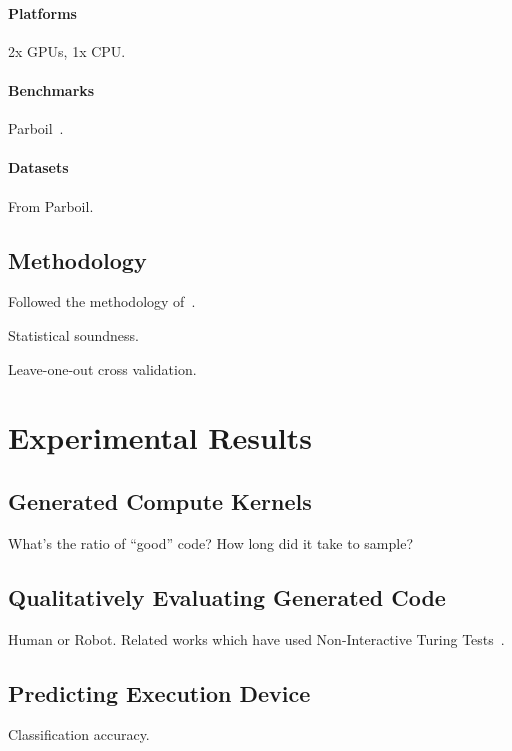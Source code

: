 \documentclass[preprint,nonatbib,10pt,nocopyrightspace]{sigplanconf}
\begin{document}
\paragraph{Platforms} 2x GPUs, 1x CPU.


\paragraph{Benchmarks}

Parboil~\cite{Stratton2012}.


\paragraph{Datasets}

From Parboil.


\subsection{Methodology}

Followed the methodology of~\cite{Grewe2013}.

Statistical soundness.

Leave-one-out cross validation.


\section{Experimental Results}\label{sec:evaluation}


\subsection{Generated Compute Kernels}\label{subsec:}

What's the ratio of ``good'' code? How long did it take to sample?


\subsection{Qualitatively Evaluating Generated Code}\label{subsec:}

Human or Robot. Related works which have used Non-Interactive Turing
Tests~\cite{Gao2015a,Zhang2016}.


\subsection{Predicting Execution Device}\label{subsec:}

Classification accuracy.
\end{document}
